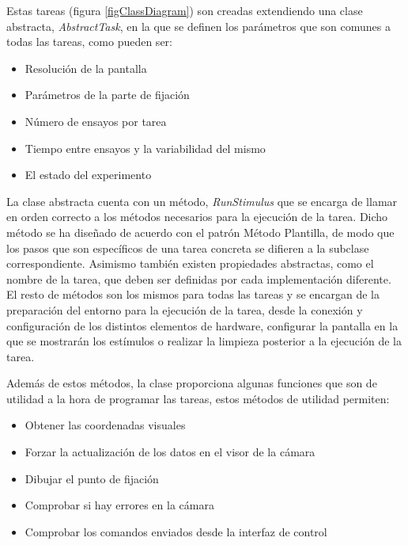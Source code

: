 \documentclass[conference]{IEEEtran}
\begin{document}
Estas tareas (figura \ref{figClassDiagram}) son creadas extendiendo una clase abstracta, \textit{AbstractTask}, en la que se definen los parámetros que son comunes a todas las tareas, como pueden ser:

\begin{itemize}

	\item Resolución de la pantalla
	\item Parámetros de la parte de fijación
	\item Número de ensayos por tarea
	\item Tiempo entre ensayos y la variabilidad del mismo
	\item El estado del experimento

\end{itemize}

La clase abstracta cuenta con un método, \textit{RunStimulus} que se encarga de llamar en orden correcto a los métodos necesarios para la ejecución de la tarea.
Dicho método se ha diseñado de acuerdo con el patrón Método Plantilla, de modo que los pasos que  son específicos de una tarea concreta se difieren a la subclase correspondiente.
Asimismo también existen propiedades abstractas, como el nombre de la tarea, que deben ser definidas por cada implementación diferente.
El resto de métodos son los mismos para todas las tareas y se encargan de la preparación del entorno para la ejecución de la tarea, desde la conexión y configuración de los distintos elementos de hardware, configurar la pantalla en la que se mostrarán los estímulos o realizar la limpieza posterior a la ejecución de la tarea.

Además de estos métodos, la clase proporciona algunas funciones que son de utilidad a la hora de programar las tareas, estos métodos de utilidad permiten:

\begin{itemize}
	\item Obtener las coordenadas visuales
	\item Forzar la actualización de los datos en el visor de la cámara
	\item Dibujar el punto de fijación
	\item Comprobar si hay errores en la cámara
	\item Comprobar los comandos enviados desde la interfaz de control
\end{itemize}
\end{document}
